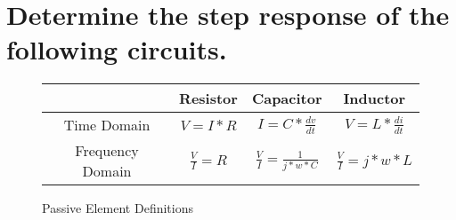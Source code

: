 \documentclass[main.tex]{subfiles}
\begin{document}
\section{Determine the step response of the following circuits.}

\begin{figure}[h!]
    \centering
    \begin{tabular}{|c|c|c|c|}
        \hline
         & Resistor & Capacitor & Inductor \\ \hline
        Time Domain & $V = I * R$ & $I = C * \frac{dv}{dt}$ & $V = L * \frac{di}{dt}$ \\ \hline
        Frequency Domain & $\frac{V}{I} = R$ & $\frac{V}{I} = \frac{1}{j*w*C}$ & $\frac{V}{I} = j*w*L$ \\ \hline
    \end{tabular}
    \caption{Passive Element Definitions}
    \label{fig:passive definitions}
\end{figure}





\end{document}
